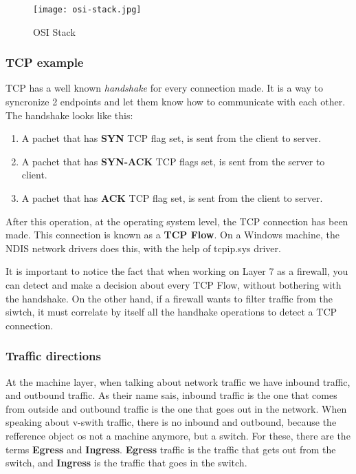 \begin{figure}[h]
\centering
\texttt{[image: osi-stack.jpg]}
\caption{OSI Stack}
\label{osi-stack}
\end{figure}

\vspace{5mm}
\subsubsection{TCP example}
\vspace{5mm}

TCP has a well known \textit{handshake} for every connection made. It is a way to syncronize 2 endpoints and let them know how to communicate with each other.
The handshake looks like this:

\begin{enumerate}
\item A pachet that has \textbf{SYN} TCP flag set, is sent from the client to server.
\item A pachet that has \textbf{SYN-ACK} TCP flags set, is sent from the server to client.
\item A pachet that has \textbf{ACK} TCP flag set, is sent from the client to server.
\end{enumerate}

\vspace{5mm}

After this operation, at the operating system level, the TCP connection has been made. This connection is known as a \textbf{TCP Flow}. On a Windows machine,
the NDIS network drivers does this, with the help of tcpip.sys driver.

\vspace{5mm}

It is important to notice the fact that when working on Layer 7 as a firewall, you can detect and make a decision about every TCP Flow, without bothering with
the handshake. On the other hand, if a firewall wants to filter traffic from the siwtch, it must correlate by itself all the handhake operations to detect a TCP connection.

\vspace{5mm}
\subsubsection{Traffic directions}
\vspace{5mm}
At the machine layer, when talking about network traffic we have inbound traffic, and outbound traffic. As their name sais, inbound traffic is the one that comes from
outside and outbound traffic is the one that goes out in the network. When speaking about v-swith traffic, there is no inbound and outbound, because the refference object os not 
a machine anymore, but a switch. For these, there are the terms \textbf{Egress} and \textbf{Ingress}. \textbf{Egress} traffic is the traffic that gets out from the switch,
and \textbf{Ingress} is the traffic that goes in the switch.

